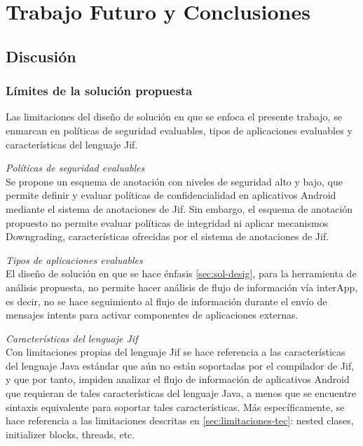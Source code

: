 \label{ch:trabajoFuturo}
\chapter{Trabajo Futuro y Conclusiones}
\section{Discusión}
\subsection{Límites de la solución propuesta}
Las limitaciones del diseño de solución en que se enfoca el presente trabajo, se
enmarcan en políticas de seguridad evaluables, tipos de aplicaciones evaluables 
y características del lenguaje Jif.

\emph{Políticas de seguridad evaluables}\\
Se propone un esquema de anotación con niveles de seguridad alto y
bajo, que permite definir y evaluar políticas de confidencialidad en aplicativos
Android mediante el sistema de anotaciones de Jif.
Sin embargo, el esquema de anotación propuesto no permite evaluar políticas de
integridad ni aplicar mecanismos Downgrading, características ofrecidas por el
sistema de anotaciones de Jif.

\emph{Tipos de aplicaciones evaluables}\\
El diseño de solución en que se hace énfasis \ref{sec:sol-desig}, para la
herramienta de análisis propuesta, no permite hacer análisis de flujo de
información vía interApp, es decir, no se hace seguimiento al flujo de
información durante el envío de mensajes intents para activar componentes de
aplicaciones externas.

\emph{Características del lenguaje Jif}\\
Con limitaciones propias del lenguaje Jif se hace referencia a las
características del lenguaje Java estándar que aún no están soportadas por el
compilador de Jif, y que por tanto, impiden analizar el flujo de información de
aplicativos Android que requieran de tales características del lenguaje Java, a
menos que se encuentre sintaxis equivalente para soportar tales
características.\newline 
Más específicamente, se hace referencia a las limitaciones descritas en
\ref{sec:limitaciones-tec}: nested clases, initializer blocks, threads, etc.

